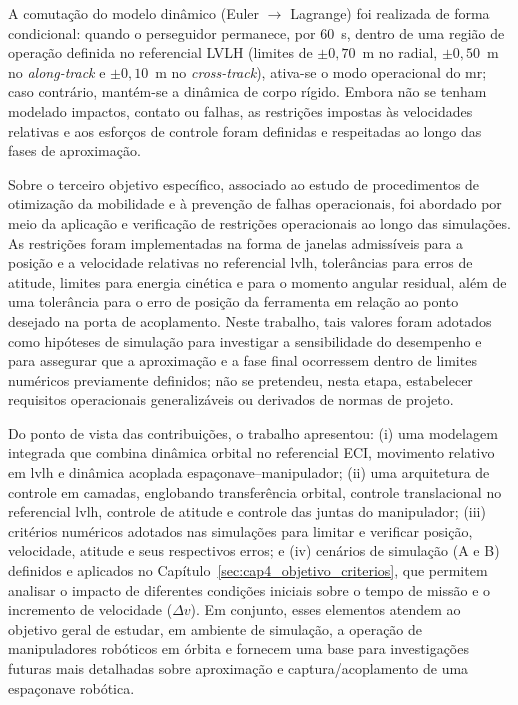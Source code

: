 A comutação do modelo dinâmico (Euler $\rightarrow$ Lagrange) foi realizada de forma condicional: quando o perseguidor permanece, por $60$~s, dentro de uma região de operação definida no referencial LVLH (limites de $\pm 0{,}70$~m no radial, $\pm 0{,}50$~m no \emph{along-track} e $\pm 0{,}10$~m no \emph{cross-track}), ativa-se o modo operacional do \gls{mr};
caso contrário, mantém-se a dinâmica de corpo rígido.
Embora não se tenham modelado impactos, contato ou falhas, as restrições impostas às velocidades relativas e aos esforços de controle foram definidas e respeitadas ao longo das fases de aproximação.


Sobre o terceiro objetivo específico, associado ao estudo de procedimentos de otimização da mobilidade e à prevenção de falhas operacionais, foi abordado por meio da aplicação e verificação de restrições operacionais ao longo das simulações.
As restrições foram implementadas na forma de janelas admissíveis para a posição e a velocidade relativas no referencial \gls{lvlh}, tolerâncias para erros de atitude, limites para energia cinética e para o momento angular residual, além de uma tolerância para o erro de posição da ferramenta em relação ao ponto desejado na porta de acoplamento.
Neste trabalho, tais valores foram adotados como hipóteses de simulação para investigar a sensibilidade do desempenho e para assegurar que a aproximação e a fase final ocorressem dentro de limites numéricos previamente definidos; não se pretendeu, nesta etapa, estabelecer requisitos operacionais generalizáveis ou derivados de normas de projeto.

Do ponto de vista das contribuições, o trabalho apresentou:
(i) uma modelagem integrada que combina dinâmica orbital no referencial ECI, movimento relativo em \gls{lvlh} e dinâmica acoplada espaçonave--manipulador;
(ii) uma arquitetura de controle em camadas, englobando transferência orbital, controle translacional no referencial \gls{lvlh}, controle de atitude e controle das juntas do manipulador;
(iii) critérios numéricos adotados nas simulações para limitar e verificar posição, velocidade, atitude e seus respectivos erros;
e (iv) cenários de simulação (A e B) definidos e aplicados no Capítulo~\ref{sec:cap4_objetivo_criterios}, que permitem analisar o impacto de diferentes condições iniciais sobre o tempo de missão e o incremento de velocidade ($\Delta v$).
Em conjunto, esses elementos atendem ao objetivo geral de estudar, em ambiente de simulação, a operação de manipuladores robóticos em órbita e fornecem uma base para investigações futuras mais detalhadas sobre aproximação e captura/acoplamento de uma espaçonave robótica.
